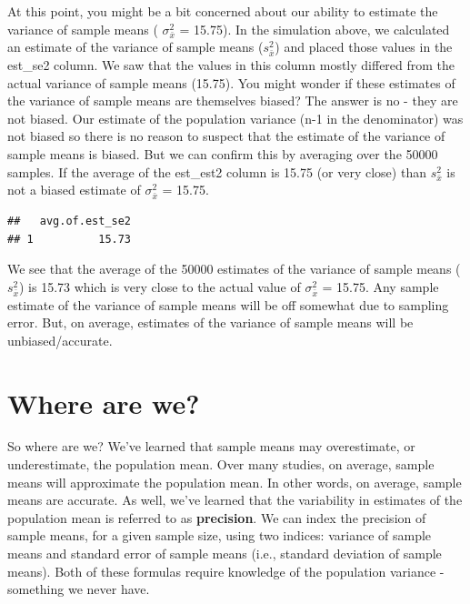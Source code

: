\documentclass[
]{krantz}
\makeatletter
\newenvironment{Shaded}{\begin{snugshade}}{\end{snugshade}}
\newcommand{\DataTypeTok}[1]{\textcolor[rgb]{0.27,0.27,0.27}{#1}}
\newcommand{\KeywordTok}[1]{\textcolor[rgb]{0.27,0.27,0.27}{\textbf{#1}}}
\newcommand{\NormalTok}[1]{#1}
\newcommand{\OperatorTok}[1]{\textcolor[rgb]{0.43,0.43,0.43}{\textbf{#1}}}
\newcommand{\StringTok}[1]{\textcolor[rgb]{0.5,0.5,0.5}{#1}}
\newenvironment{kframe}{%
\medskip{}
\setlength{\fboxsep}{.8em}
 \def\at@end@of@kframe{}%
 \ifinner\ifhmode%
  \def\at@end@of@kframe{\end{minipage}}%
  \begin{minipage}{\columnwidth}%
 \fi\fi%
 \def\FrameCommand##1{\hskip\@totalleftmargin \hskip-\fboxsep
 \colorbox{shadecolor}{##1}\hskip-\fboxsep
     \hskip-\linewidth \hskip-\@totalleftmargin \hskip\columnwidth}%
 \MakeFramed {\advance\hsize-\width
   \@totalleftmargin\z@ \linewidth\hsize
   \@setminipage}}%
 {\par\unskip\endMakeFramed%
 \at@end@of@kframe}
\renewenvironment{Shaded}{\begin{kframe}}{\end{kframe}}
\makeatother
\begin{document}
At this point, you might be a bit concerned about our ability to estimate the variance of sample means ( \(\sigma_{\bar{x}}^2\) = 15.75). In the simulation above, we calculated an estimate of the variance of sample means (\(s_{\bar{x}}^2\)) and placed those values in the est\_se2 column. We saw that the values in this column mostly differed from the actual variance of sample means (15.75). You might wonder if these estimates of the variance of sample means are themselves biased? The answer is no - they are not biased. Our estimate of the population variance (n-1 in the denominator) was not biased so there is no reason to suspect that the estimate of the variance of sample means is biased. But we can confirm this by averaging over the 50000 samples. If the average of the est\_est2 column is 15.75 (or very close) than \(s_{\bar{x}}^2\) is not a biased estimate of \(\sigma_{\bar{x}}^2\) = 15.75.

\begin{Shaded}
\end{Shaded}

\begin{verbatim}
##   avg.of.est_se2
## 1          15.73
\end{verbatim}

We see that the average of the 50000 estimates of the variance of sample means (\(s_{\bar{x}}^2\)) is 15.73 which is very close to the actual value of \(\sigma_{\bar{x}}^2\) = 15.75. Any sample estimate of the variance of sample means will be off somewhat due to sampling error. But, on average, estimates of the variance of sample means will be unbiased/accurate.

\hypertarget{where-are-we}{%
\section{Where are we?}\label{where-are-we}}

So where are we? We've learned that sample means may overestimate, or underestimate, the population mean. Over many studies, on average, sample means will approximate the population mean. In other words, on average, sample means are accurate. As well, we've learned that the variability in estimates of the population mean is referred to as \textbf{precision}. We can index the precision of sample means, for a given sample size, using two indices: variance of sample means and standard error of sample means (i.e., standard deviation of sample means). Both of these formulas require knowledge of the population variance - something we never have.
\end{document}
